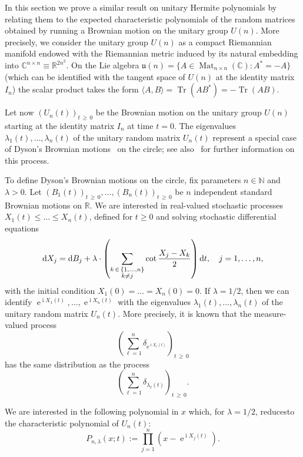 \documentclass[AHL,Unicode,longabstracts,published]{cedram}
\DeclareMathOperator*{\Tr}{Tr}
\DeclareMathOperator{\Mat}{Mat}
\DeclareMathOperator{\eee}{e}
\DeclareMathOperator{\ii}{i}
\newcommand{\fku}{\mathfrak{u}}
\newcommand{\R}{\mathbb{R}}
\newcommand{\N}{\mathbb{N}}
\newcommand{\C}{\mathbb{C}}
\newcommand*\dint{\text{\normalfont d}}
\begin{document}
In this section we prove a similar result on unitary Hermite polynomials by relating them to the expected characteristic polynomials of the random matrices obtained by running a Brownian motion on the unitary group $U(n)$. More precisely, we consider the unitary group $U(n)$ as a compact Riemannian manifold endowed with the Riemannian metric induced by its natural embedding into $\C^{n\times n}\equiv \R^{2n^2}$. On the Lie algebra $\fku(n)= \{A\in \Mat_{n\times n}(\C): A^* = -A\}$ (which can be identified with the tangent space of $U(n)$ at the identity matrix $I_n$) the scalar product takes the form $\langle A, B\rangle = \Tr (A B^*) = - \Tr (AB)$.

Let now $(U_n(t))_{t\,\geq\,0}$ be the Brownian motion on the unitary group $U(n)$ starting at the identity matrix $I_n$ at time $t=0$. The eigenvalues $\lambda_1(t), \ldots, \lambda_n(t)$ of the unitary random matrix $U_n(t)$ represent a special case of Dyson's Brownian motions~\cite[Section~III]{dyson} on the circle; see also~\cite{
biane_matrixvalued,buijsman,
cepa_lepingle_circle,
forrester2024dip,hall_notes,hobson_werner} for further information on this process.


To define Dyson's Brownian motions on the circle, fix parameters $n\in \N$ and $\lambda>0$. Let $(B_1(t))_{t\,\geq\,0},\ldots,(B_n(t))_{t\,\geq\,0}$ be $n$ independent standard Brownian motions on $\R$. We are interested in real-valued stochastic processes $X_1(t) \leq \ldots \leq X_n(t)$, defined for $t\geq 0$ and solving stochastic differential equations
\begin{equation}\label{eq:diffusions_singular_drifts}
\dint X_j = \dint B_j + \lambda \cdot \left(\sum_{\substack{k\,\in\,\{1,\ldots,n\}\\ k\neq j}} \cot \frac{X_j -X_k}{2}\right) \dint t,
\quad j=1,\ldots, n,
\end{equation}
with the initial condition $X_1(0)= \ldots = X_n(0) = 0$. If $\lambda=1/2$, then we can identify $\eee^{\ii X_1(t)},\ldots, \eee^{\ii X_n(t)}$ with the eigenvalues $\lambda_1(t), \ldots, \lambda_n(t)$ of the unitary random matrix $U_n(t)$. More precisely, it is known that the measure-valued process
\[
\left(\sum_{\ell=1}^n \delta_{\eee^{\ii X_\ell(t)}}\right)_{t\,\geq\,0}
\]
has the same distribution as the process
\[
\left(\sum_{\ell=1}^n \delta_{\lambda_\ell(t)}\right)_{t\,\geq\,0}.
\]

We are interested in the following polynomial in $x$ which, for $\lambda=1/2$, reduces\linebreak to the characteristic polynomial of $U_n(t)$:
\[
P_{n,\lambda}(x; t) := \prod_{j=1}^n \left(x- \eee^{\ii X_j(t)}\right).
\]
\end{document}
